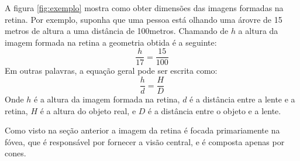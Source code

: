 \documentclass[12pt]{article}
\begin{document}
    A figura \ref{fig:exemplo} mostra como obter dimensões das imagens formadas na retina. Por exemplo,
    suponha que uma pessoa está olhando uma árovre de 15 metros de altura a uma distância de 100metros.
    Chamando de $h$ a altura da imagem formada na retina a geometria obtida é a seguinte:
    \begin{equation}
        \frac{h}{17} = \frac{15}{100}
    \end{equation}
    Em outras palavras, a equação geral pode ser escrita como:
    \begin{equation}
        \frac{h}{d} = \frac{H}{D}
    \end{equation}
    Onde $h$ é a altura da imagem formada na retina, $d$ é a distância entre a lente e a retina, $H$ é
    a altura do objeto real, e $D$ é a distância entre o objeto e a lente.

    Como visto na seção anterior a imagem da retina é focada primariamente na fóvea, que é responsável
    por fornecer a visão central, e é composta apenas por cones.
\end{document}
